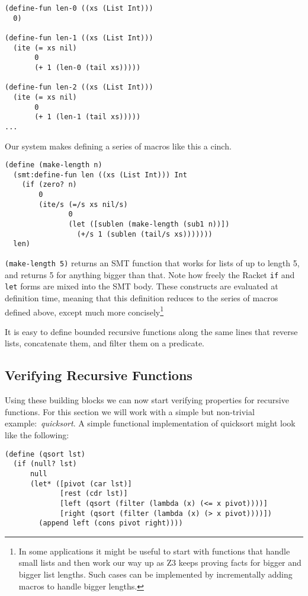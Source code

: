 \begin{verbatim}
(define-fun len-0 ((xs (List Int)))
  0)

(define-fun len-1 ((xs (List Int)))
  (ite (= xs nil)
       0
       (+ 1 (len-0 (tail xs)))))

(define-fun len-2 ((xs (List Int)))
  (ite (= xs nil)
       0
       (+ 1 (len-1 (tail xs)))))
...
\end{verbatim}

Our system makes defining a series of macros like this a cinch.

\begin{verbatim}
(define (make-length n)
  (smt:define-fun len ((xs (List Int))) Int
    (if (zero? n)
        0
        (ite/s (=/s xs nil/s)
               0
               (let ([sublen (make-length (sub1 n))])
                 (+/s 1 (sublen (tail/s xs)))))))
  len)
\end{verbatim}

\texttt{(make-length 5)} returns an SMT function that works for lists of up to
length 5, and returns 5 for anything bigger than that. Note how freely the
Racket \texttt{if} and \texttt{let} forms are mixed into the SMT body. These
constructs are evaluated at definition time, meaning that this definition
reduces to the series of macros defined above, except much more
concisely\footnote{In some applications it might be useful to start with
functions that handle small lists and then work our way up as Z3 keeps proving
facts for bigger and bigger list lengths. Such cases can be implemented by
incrementally adding macros to handle bigger lengths.}

It is easy to define bounded recursive functions along the same lines that
reverse lists, concatenate them, and filter them on a predicate.

\subsection{Verifying Recursive Functions}

Using these building blocks we can now start verifying properties for
recursive functions. For this section we will work with a simple but
non-trivial example:~\textit{quicksort}. A simple functional
implementation of quicksort might look like the following:

\begin{verbatim}
(define (qsort lst)
  (if (null? lst)
      null
      (let* ([pivot (car lst)]
             [rest (cdr lst)]
             [left (qsort (filter (lambda (x) (<= x pivot))))]
             [right (qsort (filter (lambda (x) (> x pivot))))])
        (append left (cons pivot right))))
\end{verbatim}

